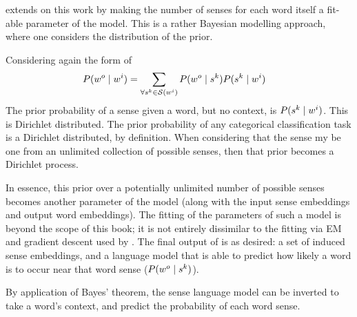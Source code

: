 \documentclass[12pt,parskip]{komatufte}
\begin{document}
 extends on this work by making the number of senses for each word itself a fit-able parameter of the model.
This is a rather Bayesian modelling approach, where one considers the distribution of the prior.




Considering again the form of 
\begin{align}
P(\n w_o\mid \n w_i) &= \sum_{\forall \n s_k \in \seq S(\n w_i)} P(\n w_o \mid \n s_k) P(\n s_k \mid \n w_i) 
\end{align}
The prior probability of a sense given a word, but no context, is 
$P(\n s_k \mid \n w_i)$.
This is Dirichlet distributed.
The prior probability of any categorical classification task is a Dirichlet distributed, by  definition.
When considering that the sense my be one from an unlimited collection of possible senses,
then that prior becomes a Dirichlet process.

In essence, this prior over a potentially unlimited number of possible senses becomes another parameter of the model (along with the input sense embeddings and output word embeddings).
The fitting of the parameters of such a model is beyond the scope of this book;
it is not entirely dissimilar to the fitting via EM and gradient descent used by  \textcite{tian2014probabilistic}.
The final output of \textcite{AdaGrams} is as desired:
a set of induced sense embeddings, 
and a language model that is able to predict how likely a word is to occur near that word sense ($P(\n w_o \mid \n s_k)$).

By application of Bayes' theorem, the sense language model can be inverted to take a word's context,
and predict the probability of each word sense.
\end{document}
